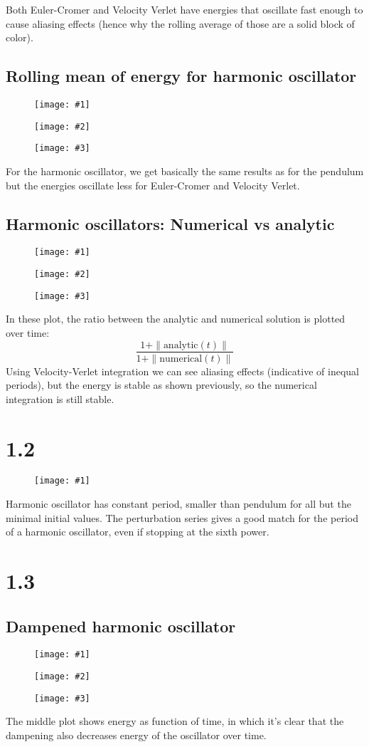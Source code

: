\documentclass[11pt]{article}
\newcommand{\triplefigure}[3]{
\begin{figure}[H]
  \centering
  \begin{minipage}{0.3\textwidth}
    \centering
    \texttt{[image: \#1]}
  \end{minipage}
  \begin{minipage}{0.3\textwidth}
    \centering
    \texttt{[image: \#2]}
  \end{minipage}
  \begin{minipage}{0.3\textwidth}
    \centering
    \texttt{[image: \#3]}
  \end{minipage}
\end{figure}
}
\newcommand{\singlefigure}[1]{
\begin{figure}[H]
  \centering
  \begin{minipage}{0.4\textwidth}
    \centering
    \texttt{[image: \#1]}
  \end{minipage}
\end{figure}
}
\begin{document}
Both Euler-Cromer and Velocity Verlet have energies that oscillate fast enough to cause aliasing effects (hence why the rolling average of those are a solid block of color).

\subsection*{Rolling mean of energy for harmonic oscillator}
\triplefigure{./plots/1_1/rollingMean_harmonic_1.png}{./plots/1_1/rollingMean_harmonic_2.png}{./plots/1_1/rollingMean_harmonic_3.png}
For the harmonic oscillator, we get basically the same results as for the pendulum but the energies oscillate less for Euler-Cromer and Velocity Verlet.

\subsection*{Harmonic oscillators: Numerical vs analytic}
\triplefigure{./plots/1_1/comparison_numanalytic_1.png}{./plots/1_1/comparison_numanalytic_2.png}{./plots/1_1/comparison_numanalytic_3.png}
In these plot, the ratio between the analytic and numerical solution is plotted over time:
$$
\frac{1 + \|\text{analytic}(t)\|}{1 + \|\text{numerical}(t)\|}
$$
Using Velocity-Verlet integration we can see aliasing effects (indicative of inequal periods), but the energy is stable as shown previously, so the numerical integration is still stable.

\section*{1.2}
\singlefigure{./plots/1_2/period.png}
Harmonic oscillator has constant period, smaller than pendulum for all but the minimal initial values.
The perturbation series gives a good match for the period of a harmonic oscillator, even if stopping at the sixth power.

\section*{1.3}

\subsection*{Dampened harmonic oscillator}
\triplefigure{./plots/1_3/dampened_dx.png}{./plots/1_3/dampened_E.png}{./plots/1_3/dampened_x.png}
The middle plot shows energy as function of time, in which it's clear that the dampening also decreases energy of the oscillator over time.
\end{document}
